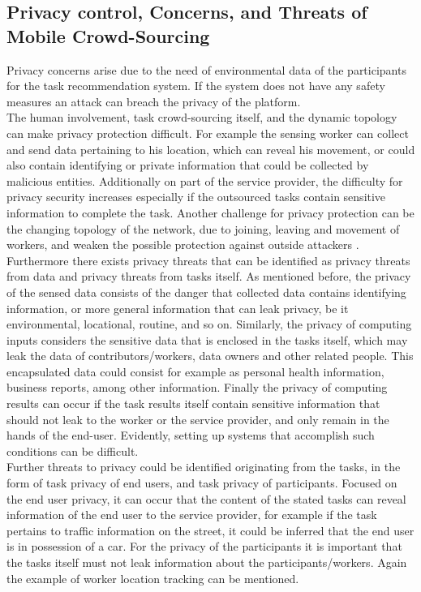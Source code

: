 \documentclass[a4paper,12pt]{report}
\begin{document}
		\subsection{Privacy control, Concerns, and Threats of Mobile Crowd-Sourcing} \label{PrivacyMCS}
		\startsubsection
			Privacy concerns arise due to the need of environmental data of the participants for the task recommendation system. If the system does not have any safety measures an attack can breach the privacy of the platform. \\
			The human involvement, task crowd-sourcing itself, and the dynamic topology can make privacy protection difficult.
			For example the sensing worker can collect and send data pertaining to his location, which can reveal his movement, or could also contain identifying or private information that could be collected by malicious entities. Additionally on part of the service provider, the difficulty for privacy security increases especially if the outsourced tasks contain sensitive information to complete the task. Another challenge for privacy protection can be the changing topology of the network, due to joining, leaving and movement of workers, and weaken the possible protection against outside attackers \cite{SecPriMobCSM}.\\
			Furthermore there exists privacy threats that can be identified as privacy threats from data and privacy threats from tasks itself. As mentioned before, the privacy of the sensed data consists of the danger that collected data contains identifying information, or more general information that can leak privacy, be it environmental, locational, routine, and so on. Similarly, the privacy of computing inputs considers the sensitive data that is enclosed in the tasks itself, which may leak the data of contributors/workers, data owners and other related people. This encapsulated data could consist for example as personal health information, business reports, among other information. Finally the privacy of computing results can occur if the task results itself contain sensitive information that should not leak to the worker or the service provider, and only remain in the hands of the end-user. Evidently, setting up systems that accomplish such conditions can be difficult.\\
			Further threats to privacy could be identified originating from the tasks, in the form of task privacy of end users, and task privacy of participants. Focused on the end user privacy, it can occur that the content of the stated tasks can reveal information of the end user to the service provider, for example if the task pertains to traffic information on the street, it could be inferred that the end user is in possession of a car. For the privacy of the participants it is important that the tasks itself must not leak information about the participants/workers. Again the example of worker location tracking can be mentioned.\\
\end{document}
